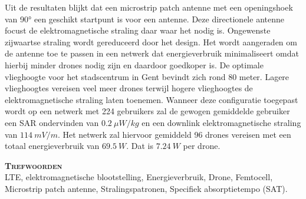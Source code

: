 Uit de resultaten blijkt dat een microstrip patch antenne
met een openingshoek van \ang{90} een geschikt startpunt is voor een antenne.
Deze directionele  antenne focust de elektromagnetische straling daar waar het nodig is.
Ongewenste zijwaartse straling wordt gereduceerd door het design.
Het wordt aangeraden om de antenne toe te passen in een netwerk dat energieverbruik minimaliseert
omdat hierbij minder drones nodig zijn en daardoor goedkoper is.
De optimale vlieghoogte voor het stadscentrum in Gent bevindt zich rond 80  meter.
Lagere vlieghoogtes vereisen veel meer drones terwijl hogere vlieghoogtes de 
elektromagnetische straling laten toenemen.
Wanneer deze configuratie toegepast wordt op een netwerk met 224 gebruikers zal de gewogen gemiddelde gebruiker 
een SAR ondervinden van  $0.2\ \mu W/kg$ en een downlink elektromagnetische straling van 
$114\ mV/m$. Het netwerk zal hiervoor gemiddeld 96 drones vereisen met een totaal energieverbruik 
van $69.5\ W$. Dat is $7.24\ W$ per drone.

\textsc{\textbf{\LARGE Trefwoorden}}\\
LTE, elektromagnetische blootstelling, 
Energieverbruik, Drone,
Femtocell, Microstrip patch antenne, Stralingspatronen, Specifiek absorptietempo (SAT).

